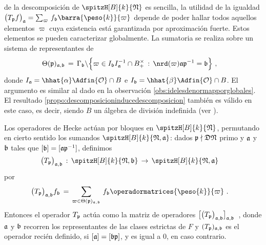 de la descomposici\'{o}n de $\spitzH[B]{k}{\frak{N}}$ es sencilla, la utilidad
de la igualdad
\begin{math}
	\big(T_{\frak{p}}f\big)_{\frak{a}}=
		\sum_{\varpi}\,f_{\frak{b}}\barra{\peso{k}}{\varpi}
\end{math}
depende de poder hallar todos aquellos elementos $\varpi$ cuya existencia
est\'{a} garantizada por aproximaci\'{o}n fuerte. Estos elementos se pueden
caracterizar globalmente. La sumatoria se realiza sobre un sistema de
representantes de
\begin{align*}
	\Theta(\frak{p})_{\frak{a},\frak{b}} & \,=\,
		\Gamma_{\frak{b}}\backslash\Big\{\varpi\in
			I_{\frak{b}}I_{\frak{a}}^{-1}\cap B_{+}^{\times}\,:\,
			\nrd(\varpi)\frak{a}\frak{p}^{-1}=\frak{b}
		\Big\}
	\text{ ,}
\end{align*}
%
donde $I_{\frak{a}}=\hhat{\alpha}\Adfin{\cal{O}}\cap B$ e
$I_{\frak{b}}=\hhat{\beta}\Adfin{\cal{O}}\cap B$. El argumento es similar al
dado en la observaci\'{o}n \ref{obs:idelesdenormapporglobales}. El resultado
\ref{propo:descomposicioninducedescomposicion} tambi\'{e}n es v\'{a}lido en
este caso, es decir, siendo $B$ un \'{a}lgebra de divisi\'{o}n indefinida (ver
\cite[Propo.~2.3]{ShimuraDirichletSeriesAndAbelianVarieties}).

\begin{obsHeckeParaIndefinidosPorBloques}%
	\label{obs:heckeparaindefinidosporbloques}
	Los operadores de Hecke act\'{u}an por bloques en
	$\spitzH[B]{k}{\frak{N}}$, permutando en cierto sentido los sumandos
	$\spitzH[B]{k}{\frak{N},\frak{a}}$: dados
	$\frak{p}\nmid\frak{D}\frak{N}$ primo y $\frak{a}$ y $\frak{b}$ tales
	que $[\frak{b}]=[\frak{a}\frak{p}^{-1}]$, definimos
	\begin{align*}
		\big(T_{\frak{p}}\big)_{\frak{a},\frak{b}} & \,:\,
			\spitzH[B]{k}{\frak{N},\frak{b}}\,\rightarrow\,
			\spitzH[B]{k}{\frak{N},\frak{a}}
	\end{align*}
	por
	\begin{align*}
		\big(T_{\frak{p}}\big)_{\frak{a},\frak{b}}f_{\frak{b}} & \,=\,
		\sum_{\varpi\in\Theta(\frak{p})_{\frak{a},\frak{b}}}\,
			f_{\frak{b}}\operadormatrices{\peso{k}}{\varpi}
		\text{ .}
	\end{align*}
	Entonces el operador $T_{\frak{p}}$ act\'{u}a como la matriz de
	operadores
	\begin{math}
		\big[\big(T_{\frak{p}}\big)_{\frak{a},\frak{b}}
			\big]_{\frak{a},\frak{b}}
	\end{math}~,
	donde $\frak{a}$ y $\frak{b}$ recorren los representantes de las
	clases estrictas de $F$ y $(T_{\frak{p}})_{\frak{a},\frak{b}}$ es
	el operador reci\'{e}n definido, si $[\frak{a}]=[\frak{b}\frak{p}]$, y
	es igual a $0$, en caso contrario.
\end{obsHeckeParaIndefinidosPorBloques}


